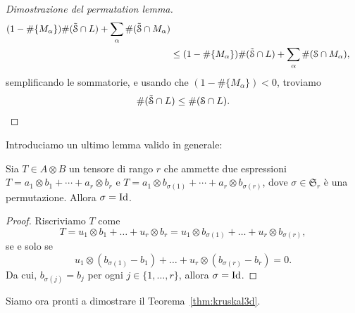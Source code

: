 \begin{proof}[Dimostrazione del permutation lemma]
\begin{equation*}
\begin{aligned}
			(1 - \#\{M_{\alpha}\})\#(\tilde{\mathcal{S}} \cap L) + \sum_\alpha \#(\tilde{\mathcal{S}} \cap M_{\alpha}) \\
			                                                                         & \le
			(1 - \#\{M_{\alpha}\})\#(\tilde{\mathcal{S}} \cap L) + \sum_\alpha \#(\mathcal{S} \cap M_{\alpha}),
		\end{aligned}
	\end{equation*}
	semplificando le sommatorie, e usando che $ (1 - \#\{M_{\alpha}\}) < 0 $, troviamo
	\begin{equation*}
		\#(\tilde{\mathcal{S}} \cap L) \le \#(\mathcal{S} \cap L).
	\end{equation*}
\end{proof}

Introduciamo un ultimo lemma valido in generale:
\begin{lemma}
	\label{lhm:two_case_permuted_tensor}
	Sia $ T \in A \otimes B $ un tensore di rango $ r $ che ammette due espressioni
	$ T = a_1 \otimes b_1 + \cdots + a_r \otimes b_r $ e $ T = a_1 \otimes b_{\sigma(1)} + \cdots +
		a_{r} \otimes b_{\sigma(r)}$, dove $ \sigma \in \mathfrak{S}_{r} $ è una permutazione. Allora $ \sigma = \operatorname{Id} $.
\end{lemma}
\begin{proof}
	Riscriviamo $ T $ come
	\begin{equation*}
		T = u_1 \otimes b_1 + \ldots + u_r \otimes b_r = u_1 \otimes b_{\sigma(1)} + \ldots + u_r \otimes
		b_{\sigma(r)},
	\end{equation*}
	se e solo se
	\begin{equation*}
		u_1 \otimes (b_{\sigma(1)} - b_1) + \ldots + u_r \otimes (b_{\sigma(r)}- b_r) = 0.
	\end{equation*}
	Da cui, $ b_{\sigma(j)} = b_j  $ per ogni $ j \in \{1, \ldots, r\}  $, allora $
		\sigma = \operatorname{Id} $.
\end{proof}
Siamo ora pronti a dimostrare il Teorema~\ref{thm:kruskal3d}.

